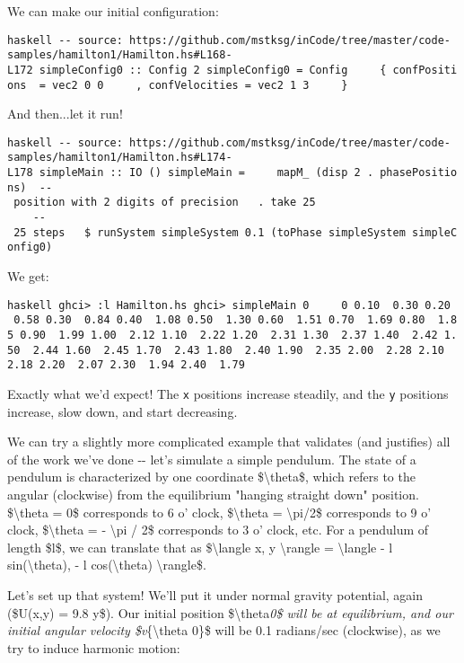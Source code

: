 \documentclass[]{article}
\begin{document}
We can make our initial configuration:

\texttt{haskell\ -\/-\ source:\ https://github.com/mstksg/inCode/tree/master/code-samples/hamilton1/Hamilton.hs\#L168-L172\ simpleConfig0\ ::\ Config\ 2\ simpleConfig0\ =\ Config\ \ \ \ \ \{\ confPositions\ \ =\ vec2\ 0\ 0\ \ \ \ \ ,\ confVelocities\ =\ vec2\ 1\ 3\ \ \ \ \ \}}

And then...let it run!

\texttt{haskell\ -\/-\ source:\ https://github.com/mstksg/inCode/tree/master/code-samples/hamilton1/Hamilton.hs\#L174-L178\ simpleMain\ ::\ IO\ ()\ simpleMain\ =\ \ \ \ \ mapM\_\ (disp\ 2\ .\ phasePositions)\ \ -\/-\ position\ with\ 2\ digits\ of\ precision\ \ \ .\ take\ 25\ \ \ \ \ \ \ \ \ \ \ \ \ \ \ \ \ \ \ \ \ \ \ \ \ \ -\/-\ 25\ steps\ \ \ \$\ runSystem\ simpleSystem\ 0.1\ (toPhase\ simpleSystem\ simpleConfig0)}

We get:

\texttt{haskell\ ghci\textgreater{}\ :l\ Hamilton.hs\ ghci\textgreater{}\ simpleMain\ 0\ \ \ \ \ 0\ 0.10\ \ 0.30\ 0.20\ \ 0.58\ 0.30\ \ 0.84\ 0.40\ \ 1.08\ 0.50\ \ 1.30\ 0.60\ \ 1.51\ 0.70\ \ 1.69\ 0.80\ \ 1.85\ 0.90\ \ 1.99\ 1.00\ \ 2.12\ 1.10\ \ 2.22\ 1.20\ \ 2.31\ 1.30\ \ 2.37\ 1.40\ \ 2.42\ 1.50\ \ 2.44\ 1.60\ \ 2.45\ 1.70\ \ 2.43\ 1.80\ \ 2.40\ 1.90\ \ 2.35\ 2.00\ \ 2.28\ 2.10\ \ 2.18\ 2.20\ \ 2.07\ 2.30\ \ 1.94\ 2.40\ \ 1.79}

Exactly what we'd expect! The \texttt{x} positions increase steadily, and the
\texttt{y} positions increase, slow down, and start decreasing.

We can try a slightly more complicated example that validates (and justifies)
all of the work we've done -\/- let's simulate a simple pendulum. The state of a
pendulum is characterized by one coordinate \$\textbackslash{}theta\$, which
refers to the angular (clockwise) from the equilibrium "hanging straight down"
position. \$\textbackslash{}theta = 0\$ corresponds to 6 o' clock,
\$\textbackslash{}theta = \textbackslash{}pi/2\$ corresponds to 9 o' clock,
\$\textbackslash{}theta = - \textbackslash{}pi / 2\$ corresponds to 3 o' clock,
etc. For a pendulum of length \$l\$, we can translate that as
\$\textbackslash{}langle x, y \textbackslash{}rangle = \textbackslash{}langle -
l sin(\textbackslash{}theta), - l cos(\textbackslash{}theta)
\textbackslash{}rangle\$.

Let's set up that system! We'll put it under normal gravity potential, again
(\$U(x,y) = 9.8 y\$). Our initial position \$\textbackslash{}theta\emph{0\$ will
be at equilibrium, and our initial angular velocity \$v}\{\textbackslash{}theta
0\}\$ will be 0.1 radians/sec (clockwise), as we try to induce harmonic motion:
\end{document}
